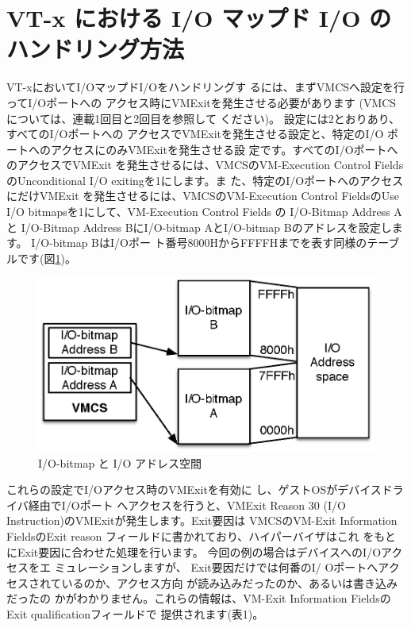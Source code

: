 \documentclass[a4j,12pt]{jarticle}
\begin{document}
\section{VT-x における I/O マップド I/O のハンドリング方法}

 VT-xにおいてI/OマップドI/Oをハンドリングす
るには、まずVMCSへ設定を行ってI/Oポートへの
アクセス時にVMExitを発生させる必要があります
(VMCSについては、連載1回目と2回目を参照して
ください)。
 設定には2とおりあり、すべてのI/Oポートへの
アクセスでVMExitを発生させる設定と、特定のI/O
ポートへのアクセスにのみVMExitを発生させる設
定です。すべてのI/OポートへのアクセスでVMExit
を発生させるには、VMCSのVM-Execution Control
FieldsのUnconditional I/O exitingを1にします。ま
た、特定のI/OポートへのアクセスにだけVMExit
を発生させるには、VMCSのVM-Execution Control
FieldsのUse I/O bitmapsを1にして、VM-Execution
Control Fields の I/O-Bitmap Address A と
I/O-Bitmap Address BにI/O-bitmap AとI/O-bitmap
Bのアドレスを設定します。 I/O-bitmap BはI/Oポー
ト番号8000HからFFFFHまでを表す同様のテーブルです(図\ref{fig1})。

\begin{figure}

\includegraphics{figures/part3_fig1_IO_bitmaps.eps}

\caption{I/O-bitmap と I/O アドレス空間}
\label{fig1}

\end{figure}

 これらの設定でI/Oアクセス時のVMExitを有効に
し、ゲストOSがデバイスドライバ経由でI/Oポート
へアクセスを行うと、VMExit Reason 30 (I/O
Instruction)のVMExitが発生します。Exit要因は
VMCSのVM-Exit Information FieldsのExit reason
フィールドに書かれており、ハイパーバイザはこれ
をもとにExit要因に合わせた処理を行います。
 今回の例の場合はデバイスへのI/Oアクセスをエ
ミュレーションしますが、 Exit要因だけでは何番のI/
Oポートへアクセスされているのか、アクセス方向
が読み込みだったのか、あるいは書き込みだったの
かがわかりません。これらの情報は、VM-Exit
Information FieldsのExit qualificationフィールドで
提供されます(表1)。
\end{document}
